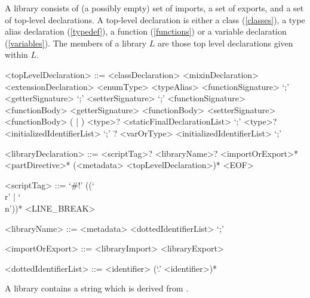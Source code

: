 \documentclass[makeidx]{article}
\begin{document}
{\LMHash{}%
A library consists of (a possibly empty) set of imports, a set of exports,
and a set of top-level declarations.
A top-level declaration is either a class (\ref{classes}),
a type alias declaration (\ref{typedef}),
a function (\ref{functions})
or a variable declaration (\ref{variables}).
The members of a library $L$ are those top level declarations given within $L$.

\begin{grammar}
<topLevelDeclaration> ::= <classDeclaration>
  \alt <mixinDeclaration>
  \alt <extensionDeclaration>
  \alt <enumType>
  \alt <typeAlias>
  \alt \EXTERNAL{} <functionSignature> `;'
  \alt \EXTERNAL{} <getterSignature> `;'
  \alt \EXTERNAL{} <setterSignature> `;'
  \alt <functionSignature> <functionBody>
  \alt <getterSignature> <functionBody>
  \alt <setterSignature> <functionBody>
  \alt (\FINAL{} | \CONST{}) <type>? <staticFinalDeclarationList> `;'
  \alt \LATE{} \FINAL{} <type>? <initializedIdentifierList> `;'
  \alt \LATE? <varOrType> <initializedIdentifierList> `;'

<libraryDeclaration> ::= \gnewline{}
  <scriptTag>? <libraryName>? <importOrExport>* <partDirective>*
  \gnewline{} (<metadata> <topLevelDeclaration>)* <EOF>

<scriptTag> ::= `#!' (\gtilde(`\\r' | `\\n'))* <LINE\_BREAK>

<libraryName> ::= <metadata> \LIBRARY{} <dottedIdentifierList> `;'

<importOrExport> ::= <libraryImport>
  \alt <libraryExport>

<dottedIdentifierList> ::= <identifier> (`.' <identifier>)*
\end{grammar}

\LMHash{}%
A library contains a string which is derived from .


}
\end{document}
